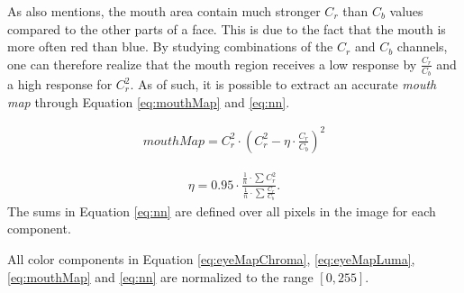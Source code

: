 
 As \cite{fdInColorImages} also mentions, the mouth area contain much stronger $C_{r}$ than $C_{b}$ values compared to the other parts of a face. This is due to the fact that the mouth is more often red than blue. By studying combinations of the $C_{r}$ and $C_{b}$ channels, one can therefore realize that the mouth region receives a low response by $\frac{C_{r}}{C_{b}}$ and a high response for $C_{r}^2$. As of such, it is possible to extract an accurate \textit{mouth map} through Equation \ref{eq:mouthMap} and \ref{eq:nn}.


\begin{equation} \label{eq:mouthMap}
\begin{split}
mouthMap = C_r^2 \cdot (C_r^2 - \eta \cdot \frac{C_r}{C_b})^2
\end{split}
\end{equation}

\begin{equation} \label{eq:nn}
\begin{split}
\eta = 0.95 \cdot \frac{\frac{1}{n} \cdot \sum\limits_{} C_r^2}{\frac{1}{n} \cdot \sum\limits_{} \frac{C_r}{C_b}}.
\end{split}
\end{equation}
The sums in Equation \ref{eq:nn} are defined over all pixels in the image for each component. 

All color components in Equation \ref{eq:eyeMapChroma}, \ref{eq:eyeMapLuma}, \ref{eq:mouthMap} and \ref{eq:nn} are normalized to the range $[0, 255]$.






